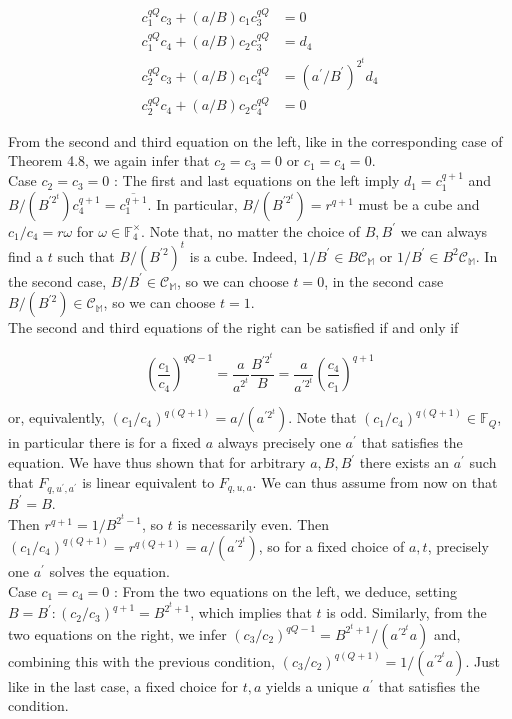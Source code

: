 \documentclass[10pt]{article}
\begin{document}
$$
\begin{aligned}
c_{1}^{q Q} c_{3}+(a / B) c_{1} c_{3}^{q Q} & =0 \\
c_{1}^{q Q} c_{4}+(a / B) c_{2} c_{3}^{q Q} & =d_{4} \\
c_{2}^{q Q} c_{3}+(a / B) c_{1} c_{4}^{q Q} & =\left(a^{\prime} / B^{\prime}\right)^{2^{t}} d_{4} \\
c_{2}^{q Q} c_{4}+(a / B) c_{2} c_{4}^{q Q} & =0
\end{aligned}
$$

From the second and third equation on the left, like in the corresponding case of Theorem 4.8, we again infer that $c_{2}=c_{3}=0$ or $c_{1}=c_{4}=0$.\\
Case $c_{2}=c_{3}=0$ : The first and last equations on the left imply $d_{1}=c_{1}^{q+1}$ and $B /\left(B^{\prime 2^{t}}\right) c_{4}^{q+1}= \overline{c_{1}^{q+1}}$. In particular, $B /\left(B^{\prime 2^{t}}\right)=r^{q+1}$ must be a cube and $c_{1} / c_{4}=r \omega$ for $\omega \in \mathbb{F}_{4}^{\times}$. Note that, no matter the choice of $B, B^{\prime}$ we can always find a $t$ such that $B /\left(B^{\prime 2}\right)^{t}$ is a cube. Indeed, $1 / B^{\prime} \in B \mathcal{C}_{\mathbb{M}}$ or $1 / B^{\prime} \in B^{2} \mathcal{C}_{\mathbb{M}}$. In the second case, $B / B^{\prime} \in \mathcal{C}_{\mathbb{M}}$, so we can choose $t=0$, in the second case $B /\left(B^{\prime 2}\right) \in \mathcal{C}_{\mathbb{M}}$, so we can choose $t=1$.\\
The second and third equations of the right can be satisfied if and only if

$$
\left(\frac{c_{1}}{c_{4}}\right)^{q Q-1}=\frac{a}{a^{2^{t}}} \frac{B^{\prime 2^{t}}}{B}=\frac{a}{a^{\prime 2^{t}}}\left(\frac{c_{4}}{c_{1}}\right)^{q+1}
$$

or, equivalently, $\left(c_{1} / c_{4}\right)^{q(Q+1)}=a /\left(a^{\prime 2^{t}}\right)$. Note that $\left(c_{1} / c_{4}\right)^{q(Q+1)} \in \mathbb{F}_{Q}$, in particular there is for a fixed $a$ always precisely one $a^{\prime}$ that satisfies the equation. We have thus shown that for arbitrary $a, B, B^{\prime}$ there exists an $a^{\prime}$ such that $F_{q, u^{\prime}, a^{\prime}}$ is linear equivalent to $F_{q, u, a}$. We can thus assume from now on that $B^{\prime}=B$.\\
Then $r^{q+1}=1 / B^{2^{t}-1}$, so $t$ is necessarily even. Then $\left(c_{1} / c_{4}\right)^{q(Q+1)}=r^{q(Q+1)}=a /\left(a^{\prime 2^{t}}\right)$, so for a fixed choice of $a, t$, precisely one $a^{\prime}$ solves the equation.\\
Case $c_{1}=c_{4}=0$ : From the two equations on the left, we deduce, setting $B=B^{\prime}:\left(c_{2} / c_{3}\right)^{q+1}= B^{2^{t}+1}$, which implies that $t$ is odd. Similarly, from the two equations on the right, we infer $\left(c_{3} / c_{2}\right)^{q Q-1}=B^{2^{t}+1} /\left(a^{\prime 2^{t}} a\right)$ and, combining this with the previous condition, $\left(c_{3} / c_{2}\right)^{q(Q+1)}= 1 /\left(a^{\prime 2^{t}} a\right)$. Just like in the last case, a fixed choice for $t, a$ yields a unique $a^{\prime}$ that satisfies the condition.
\end{document}
